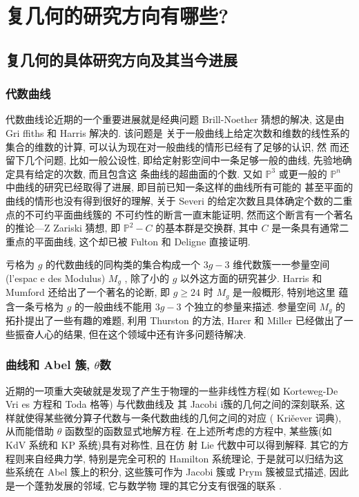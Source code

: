 \documentclass[UTF8,AutoFakeBold,scheme=chinese,eversion]{GXMU-Thesis}
\begin{document}
\section{复几何的研究方向有哪些?}

\subsection{复几何的具体研究方向及其当今进展}
\subsubsection{代数曲线}
代数曲线论近期的一个重要进展就是经典问题 Brill-Noether 猜想的解决, 这是由 Gri ffiths 和 Harris 解决的. 该问题是 关于一般曲线上给定次数和维数的线性系的集合的维数的计算, 可以认为现在对一般曲线的情形已经有了足够的认识, 然 而还留下几个问题, 比如一般公设性, 即给定射影空间中一条足够一般的曲线, 先验地确定具有给定的次数, 而且包含这 条曲线的超曲面的个数. 又如 $\mathbb{P}^3$ 或更一般的 $\mathbb{P}^n$ 中曲线的研究已经取得了进展, 即目前已知一条这样的曲线所有可能的
甚至平面的曲线的情形也没有得到很好的理解, 关于 Severi 的给定次数且具体确定个数的二重点的不可约平面曲线簇的 不可约性的断言一直末能证明, 然而这个断言有一个著名的推论—Z Zariski 猜想, 即 $\mathbb{P}^2-C$ 的基本群是交换群, 其中 $C$ 是一条具有通常二重点的平面曲线, 这个却已被 Fulton 和 Deligne 直接证明.

亏格为 $g$ 的代数曲线的同构类的集合构成一个 $3 g-3$ 维代数簇一一参量空间(l'espac e des Modulus) $M_g$ , 除了小的 $g$ 以外这方面的研究甚少. Harris 和 Mumford 还给出了一个著名的论断, 即 $g \geq 24$ 时 $M_g$ 是一般概形, 特别地这里 蕴含一条亏格为 $g$ 的一般曲线不能用 $3 g-3$ 个独立的参量来描述. 参量空间 $M_g$ 的拓扑提出了一些有趣的难题, 利用 Thurston 的方法, Harer 和 Miller 已经做出了一些振奋人心的结果, 但在这个领域中还有许多问题待解决.

\subsubsection{曲线和 Abel 簇, \texorpdfstring{$\theta$}  函数}
近期的一项重大突破就是发现了产生于物理的一些非线性方程(如 Korteweg-De Vri es 方程和 Toda 格等) 与代数曲线及 其 Jacobi i簇的几何之间的深刻联系, 这样就使得某些微分算子代数与一条代数曲线的几何之间的对应 ( Kriěever 词典),  从而能借助 $\theta$ 函数型的函数显式地解方程. 在上述所考虑的方程中, 某些簇(如 KdV 系统和 KP 系统)具有对称性, 且在仿 射 Lie 代数中可以得到解释. 其它的方程则来自经典力学, 特别是完全可积的 Hamilton 系统理论, 于是就可以归结为这 些系统在 Abel 簇上的积分, 这些簇可作为 Jacobi 簇或 Prym 簇被显式描述, 因此是一个蓬勃发展的邻域, 它与数学物 理的其它分支有很强的联系 .
\end{document}
